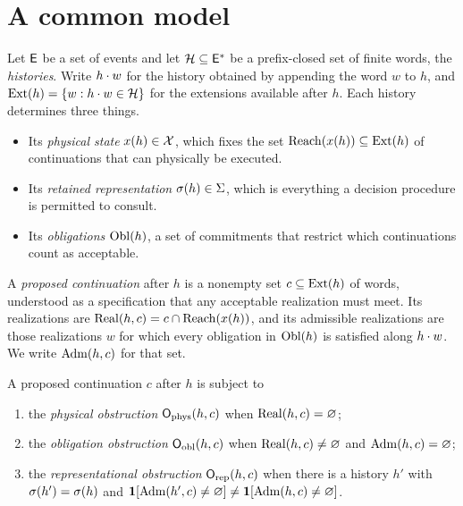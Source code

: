
\section{A common model}

Let $\mathsf{E}$ be a set of events and let $\mathcal{H}\subseteq\mathsf{E}^{*}$ be a prefix-closed set of finite words, the \emph{histories}. Write $h\cdot w$ for the history obtained by appending the word $w$ to $h$, and $\operatorname{Ext}(h)=\{w : h\cdot w\in\mathcal{H}\}$ for the extensions available after $h$. Each history determines three things.
\begin{itemize}[nosep]
  \item Its \emph{physical state} $x(h)\in\mathcal{X}$, which fixes the set $\operatorname{Reach}(x(h))\subseteq\operatorname{Ext}(h)$ of continuations that can physically be executed.
  \item Its \emph{retained representation} $\sigma(h)\in\Sigma$, which is everything a decision procedure is permitted to consult.
  \item Its \emph{obligations} $\operatorname{Obl}(h)$, a set of commitments that restrict which continuations count as acceptable.
\end{itemize}
A \emph{proposed continuation} after $h$ is a nonempty set $c\subseteq\operatorname{Ext}(h)$ of words, understood as a specification that any acceptable realization must meet. Its realizations are $\operatorname{Real}(h,c)=c\cap\operatorname{Reach}(x(h))$, and its admissible realizations are those realizations $w$ for which every obligation in $\operatorname{Obl}(h)$ is satisfied along $h\cdot w$. We write $\operatorname{Adm}(h,c)$ for that set.

\begin{definition}\label{def:obstructions}
A proposed continuation $c$ after $h$ is subject to
\begin{enumerate}[nosep,label=(\roman*)]
  \item the \emph{physical obstruction} $\mathsf{O}_{\mathrm{phys}}(h,c)$ when $\operatorname{Real}(h,c)=\varnothing$;
  \item the \emph{obligation obstruction} $\mathsf{O}_{\mathrm{obl}}(h,c)$ when $\operatorname{Real}(h,c)\neq\varnothing$ and $\operatorname{Adm}(h,c)=\varnothing$;
  \item the \emph{representational obstruction} $\mathsf{O}_{\mathrm{rep}}(h,c)$ when there is a history $h'$ with $\sigma(h')=\sigma(h)$ and $\mathbf{1}[\operatorname{Adm}(h',c)\neq\varnothing]\neq\mathbf{1}[\operatorname{Adm}(h,c)\neq\varnothing]$.
\end{enumerate}
\end{definition}

